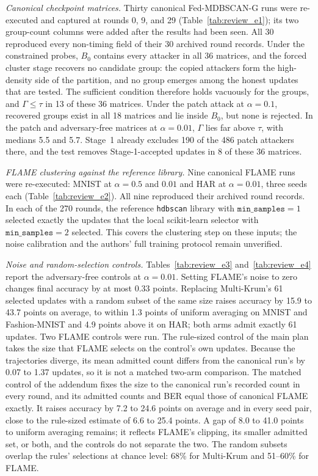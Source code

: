 \documentclass[journal]{IEEEtran}
\begin{document}
\emph{Canonical checkpoint matrices.} Thirty canonical Fed-MDBSCAN-G runs were re-executed and captured at rounds 0, 9, and 29 (Table~\ref{tab:review_e1}); its two group-count columns were added after the results had been seen. All 30 reproduced every non-timing field of their 30 archived round records. Under the constrained probes, $B_0$ contains every attacker in all 36 matrices, and the forced cluster stage recovers no candidate group: the copied attackers form the high-density side of the partition, and no group emerges among the honest updates that are tested. The sufficient condition therefore holds vacuously for the groups, and $\Gamma\leq\tau$ in 13 of these 36 matrices. Under the patch attack at $\alpha=0.1$, recovered groups exist in all 18 matrices and lie inside $B_0$, but none is rejected. In the patch and adversary-free matrices at $\alpha=0.01$, $\Gamma$ lies far above $\tau$, with medians 5.5 and 5.7. Stage~1 already excludes 190 of the 486 patch attackers there, and the test removes Stage-1-accepted updates in 8 of these 36 matrices.


\emph{FLAME clustering against the reference library.} Nine canonical FLAME runs were re-executed: MNIST at $\alpha=0.5$ and $0.01$ and HAR at $\alpha=0.01$, three seeds each (Table~\ref{tab:review_e2}). All nine reproduced their archived round records. In each of the 270 rounds, the reference \texttt{hdbscan} library with $\texttt{min\_samples}=1$ selected exactly the updates that the local scikit-learn selector with $\texttt{min\_samples}=2$ selected. This covers the clustering step on these inputs; the noise calibration and the authors' full training protocol remain unverified.


\emph{Noise and random-selection controls.} Tables~\ref{tab:review_e3} and~\ref{tab:review_e4} report the adversary-free controls at $\alpha=0.01$. Setting FLAME's noise to zero changes final accuracy by at most 0.33 points. Replacing Multi-Krum's 61 selected updates with a random subset of the same size raises accuracy by 15.9 to 43.7 points on average, to within 1.3 points of uniform averaging on MNIST and Fashion-MNIST and 4.9 points above it on HAR; both arms admit exactly 61 updates. Two FLAME controls were run. The rule-sized control of the main plan takes the size that FLAME selects on the control's own updates. Because the trajectories diverge, its mean admitted count differs from the canonical run's by 0.07 to 1.37 updates, so it is not a matched two-arm comparison. The matched control of the addendum fixes the size to the canonical run's recorded count in every round, and its admitted counts and BER equal those of canonical FLAME exactly. It raises accuracy by 7.2 to 24.6 points on average and in every seed pair, close to the rule-sized estimate of 6.6 to 25.4 points. A gap of 8.0 to 41.0 points to uniform averaging remains; it reflects FLAME's clipping, its smaller admitted set, or both, and the controls do not separate the two. The random subsets overlap the rules' selections at chance level: 68\% for Multi-Krum and 51--60\% for FLAME.


\end{document}
